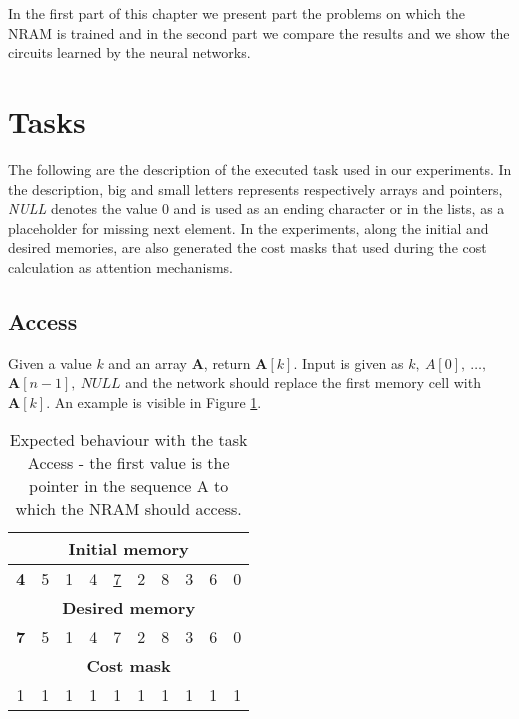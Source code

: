 \label{experiments}
In the first part of this chapter we present part the problems on which the NRAM is trained and in the second part we compare the results and we show the circuits learned by the neural networks.

\section{Tasks}
The following are the description of the executed task used in our experiments. In the description, big and small letters represents respectively arrays and pointers, \textit{NULL} denotes the value 0 and is used as an ending character or in the lists, as a placeholder for missing next element. In the experiments, along the initial and desired memories, are also generated the cost masks that used during the cost calculation as attention mechanisms.

\subsection{Access}
Given a value $k$ and an array \textbf{A}, return $\textbf{A}[k]$. Input is given as $k,\ A[0],\ \dots,\ $\\$\textbf{A}[n-1],\ \textit{NULL}$ and the network should replace the first memory cell with $\textbf{A}[k]$. An example is visible in Figure \ref{fig:access-example}.
\begin{table}[h!]
	\centering
	\begin{tabular}{|c|c|c|c|c|c|c|c|c|c|}
		\hline
		\multicolumn{10}{|c|}{\textbf{Initial memory}} \\ \hline
		\textbf{4} & 5 & 1 & 4 & \underline{7} & 2 & 8 & 3 & 6 & 0 \\ \hline\hline\hline
		\multicolumn{10}{|c|}{\textbf{Desired memory}} \\ \hline
		\textbf{7} & 5 & 1 & 4 & 7 & 2 & 8 & 3 & 6 & 0 \\ \hline\hline\hline
		\multicolumn{10}{|c|}{\textbf{Cost mask}} \\ \hline
		1 & 1 & 1 & 1 & 1 & 1 & 1 & 1 & 1 & 1 \\ \hline
	\end{tabular}
	\caption{Expected behaviour with the task Access - the first value is the pointer in the sequence A to which the NRAM should access.}
	\label{fig:access-example}
\end{table}
\FloatBarrier
